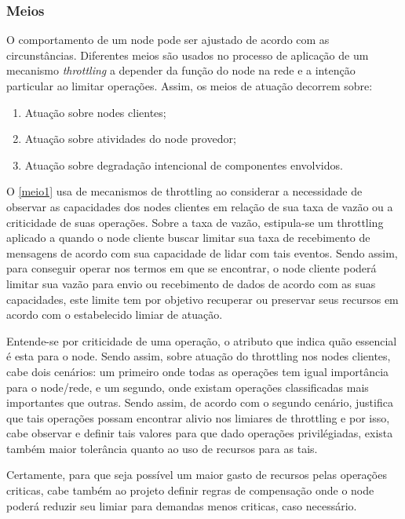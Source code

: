 \subsubsection{Meios}
O comportamento de um node pode ser ajustado de acordo com as circunstâncias. Diferentes meios são usados no processo de aplicação de um mecanismo \textit{throttling} a depender da função do node na rede e a intenção particular ao limitar operações. Assim, os meios de atuação decorrem sobre:

\begin{enumerate}[label=(\subscript{Meio} {{\arabic*}})]
	\item \label{meio1} Atuação sobre nodes clientes; 
	\item \label{meio2} Atuação sobre atividades do node provedor;
	\item \label{meio3} Atuação sobre degradação intencional de componentes envolvidos.
\end{enumerate}

O \ref{meio1} usa de mecanismos de throttling ao considerar a necessidade de observar as capacidades dos nodes clientes em relação de sua taxa de vazão ou a criticidade de suas operações. Sobre a taxa de vazão, estipula-se um throttling aplicado a quando o node cliente buscar limitar sua taxa de recebimento de mensagens de acordo com sua capacidade de lidar com tais eventos. Sendo assim, para conseguir operar nos termos em que se encontrar, o node cliente poderá limitar sua vazão para envio ou recebimento de dados de acordo com as suas capacidades, este limite tem por objetivo recuperar ou preservar seus recursos em acordo com o estabelecido limiar de atuação.

Entende-se por criticidade de uma operação, o atributo que indica quão essencial é esta para o node. Sendo assim, sobre atuação do throttling nos nodes clientes, cabe dois cenários: um primeiro onde todas as operações tem igual importância para o node/rede, e um segundo, onde existam operações classificadas mais importantes que outras. Sendo assim, de acordo com o segundo cenário, justifica que tais operações possam encontrar alivio nos  limiares de throttling  e por isso, cabe observar e definir tais valores para que dado operações privilégiadas, exista também maior tolerância quanto ao uso de recursos para as tais. 

Certamente, para que seja possível um maior gasto de recursos pelas operações criticas, cabe também ao projeto definir regras de compensação onde o node poderá reduzir seu limiar para demandas menos criticas, caso necessário.

